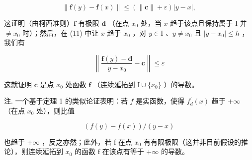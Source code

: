 \[
\left\| \mathbf {f} (y) - \mathbf {f} (x) \right\| \leqslant \left(\left\| \mathbf {c} \right\| + \varepsilon\right) | y - x |,
\]

这证明（由柯西准则）\(\mathbf{f}\) 有极限 \(\mathbf{d}\) （在点 \(x_0\) 处，当 \(x\) 趋于该点且保持属于 \(\mathrm{I}\) 并 \(\neq x_0\) 时）；然后，在 (11) 中让 \(x\) 趋于 \(x_0\) ，对 \(y \in \mathrm{I}\) 、\(y \neq x_0\) 且 \(|y - x_0| \leqslant h\) ，我们有

\[
\left\| \frac {\mathbf {f} (y) - \mathbf {d}}{y - x _ {0}} - \mathbf {c} \right\| \leqslant \varepsilon
\]

这就证明 \(\mathbf{c}\) 是点 \(x_0\) 处函数 \(\mathbf{f}\) （连续延拓到 \(\mathrm{I} \cup \{x_0\}\) ）的导数。

注. 一个基于定理 1 的类似论证表明：若 \(f\) 是实函数，使得 \(f_{d}^{\prime}(x)\) 趋于 \(+\infty\) （在点 \(x_0\) 处），则比值

\[
(f (y) - f (x)) / (y - x)
\]

也趋于 \(+\infty\) ，反之亦然；此外，若 f 在点 \(x_{0}\) 有有限极限（这并非目前假设的推论），则连续延拓到 \(x_{0}\) 的函数 f 在该点有等于 \(+\infty\) 的导数。

